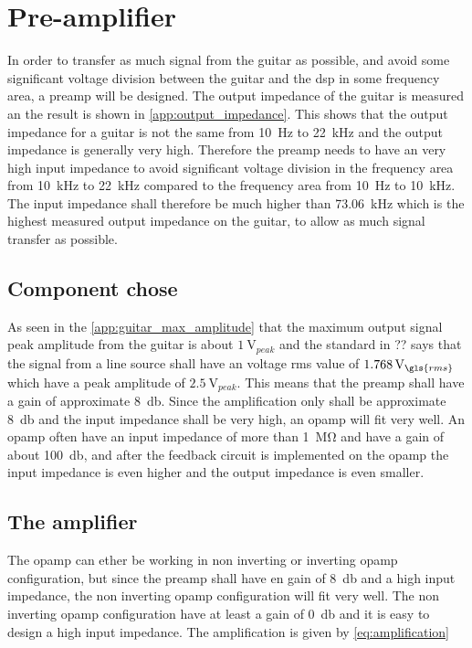 \section{Pre-amplifier}
In order to transfer as much signal from the guitar as possible, and avoid some significant voltage division between the guitar and the \gls{dsp} in some frequency area, a \gls{preamp} will be designed. The output impedance of the guitar is measured an the result is shown in \autoref{app:output_impedance}. This shows that the output impedance for a guitar is not the same from \SI{10}{\hertz} to \SI{22}{\kilo\hertz} and the output impedance is generally very high. Therefore the \gls{preamp} needs to have an very high input impedance to avoid significant voltage division in the frequency area from \SI{10}{\kilo\hertz} to \SI{22}{\kilo\hertz} compared to the frequency area from \SI{10}{\hertz} to \SI{10}{\kilo\hertz}. The input impedance shall therefore be much higher than \SI{73.06}{\kilo\hertz} which is the highest measured output impedance on the guitar, to allow as much signal transfer as possible.

\subsection{Component chose}

As seen in the \autoref{app:guitar_max_amplitude} that the maximum output signal peak amplitude from the guitar is about $\SI{1}{\volt}_{peak}$ and the standard in ?? says that the signal from a line source shall have an voltage \gls{rms} value of $\SI{1.768}{\volt}_{\gls{rms}}$ which have a peak amplitude of $\SI{2.5}{\volt}_{peak}$. This means that the \gls{preamp} shall have a gain of approximate \SI{8}{\decibel}. Since the amplification only shall be approximate \SI{8}{\decibel} and the input impedance shall be very high, an \gls{opamp} will fit very well. An \gls{opamp} often have an input impedance of more than \SI{1}{\mega\ohm} and have a gain of about \SI{100}{\decibel}, and after the feedback circuit is implemented on the \gls{opamp} the input impedance is even higher and the output impedance is even smaller.

\subsection{The amplifier}
The \gls{opamp} can ether be working in non inverting or inverting \gls{opamp} configuration, but since the \gls{preamp} shall have en gain of \SI{8}{\decibel} and a high input impedance, the non inverting \gls{opamp} configuration will fit very well. The non inverting \gls{opamp} configuration have at least a gain of \SI{0}{\decibel} and it is easy to design a high input impedance. The amplification is given by \autoref{eq:amplification}

